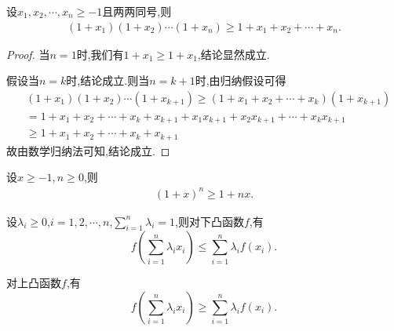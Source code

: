 \documentclass[../../main.tex]{subfiles}
\begin{document}
\begin{theorem}[Bernoulli不等式]\label{theorem:Bernoulli不等式}
设$x_1,x_2,\cdots,x_n\geqslant  -1$且两两同号,则
\begin{align*}
\left( 1+x_1 \right) \left( 1+x_2 \right) \cdots \left( 1+x_n \right) \geqslant 1+x_1+x_2+\cdots +x_n.
\end{align*}
\end{theorem}
\begin{proof}
当$n=1$时,我们有$1+x_1\geqslant  1+x_1$,结论显然成立.

假设当$n=k$时,结论成立.则当$n=k+1$时,由归纳假设可得
\begin{align*}
&\left( 1+x_1 \right) \left( 1+x_2 \right) \cdots \left( 1+x_{k+1} \right) \geqslant \left( 1+x_1+x_2+\cdots +x_k \right) \left( 1+x_{k+1} \right) 
\\
&=1+x_1+x_2+\cdots +x_k+x_{k+1}+x_1x_{k+1}+x_2x_{k+1}+\cdots +x_kx_{k+1}
\\
&\geqslant 1+x_1+x_2+\cdots +x_k+x_{k+1}
\end{align*}
故由数学归纳法可知,结论成立.
\end{proof}

\begin{theorem}[Bernoulli不等式特殊形式]\label{theorem:Bernoulli不等式特殊形式}
设$x\geqslant -1,n\geqslant  0$,则
\begin{align*}
(1+x)^n\geqslant1+nx.
\end{align*}
\end{theorem}

\begin{theorem}[Jesen不等式]\label{theorem:Jesen不等式}
设\(\lambda_i \geqslant  0\),\(i = 1,2,\cdots,n\),\(\sum\limits_{i = 1}^{n} \lambda_i = 1\),则对下凸函数\(f\),有
\[
f\left(\sum\limits_{i = 1}^{n} \lambda_i x_i\right) \leqslant  \sum\limits_{i = 1}^{n} \lambda_i f(x_i).
\]

对上凸函数\(f\),有
\[
f\left(\sum\limits_{i = 1}^{n} \lambda_i x_i\right) \geqslant  \sum\limits_{i = 1}^{n} \lambda_i f(x_i).
\]
\end{theorem}
\end{document}
